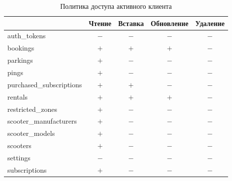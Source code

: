 \begin{table}[H]
	\begin{threeparttable}[b]
		\caption{Политика доступа активного клиента}
		\label{tbl:active-client-policy}
		{\renewcommand{\arraystretch}{1.2}
			\begin{tabularx}{\textwidth}
				{
					| >{\raggedright\arraybackslash}X
					| >{\centering\arraybackslash}c
					| >{\centering\arraybackslash}c
					| >{\centering\arraybackslash}c
					| >{\centering\arraybackslash}c |
				}
				\hline
				                         & \textbf{Чтение}     & \textbf{Вставка} & \textbf{Обновление} & \textbf{Удаление} \\
				\hline
				auth\_tokens             & $-$                 & $-$              & $-$                 & $-$               \\
				\hline
				bookings                 & $+$\rlap{\tnote{1}} & $+$              & $+$\rlap{\tnote{1}} & $-$               \\
				\hline
				parkings                 & $+$                 & $-$              & $-$                 & $-$               \\
				\hline
				pings                    & $+$\rlap{\tnote{2}} & $-$              & $-$                 & $-$               \\
				\hline
				purchased\_subscriptions & $+$\rlap{\tnote{3}} & $+$              & $-$                 & $-$               \\
				\hline
				rentals                  & $+$\rlap{\tnote{4}} & $+$              & $+$\rlap{\tnote{4}} & $-$               \\
				\hline
				restricted\_zones        & $+$                 & $-$              & $-$                 & $-$               \\
				\hline
				scooter\_manufacturers   & $+$                 & $-$              & $-$                 & $-$               \\
				\hline
				scooter\_models          & $+$                 & $-$              & $-$                 & $-$               \\
				\hline
				scooters                 & $+$\rlap{\tnote{5}} & $-$              & $-$                 & $-$               \\
				\hline
				settings                 & $-$                 & $-$              & $-$                 & $-$               \\
				\hline
				subscriptions            & $+$                 & $-$              & $-$                 & $-$               \\

\end{tabularx}}
\end{threeparttable}
\end{table}
